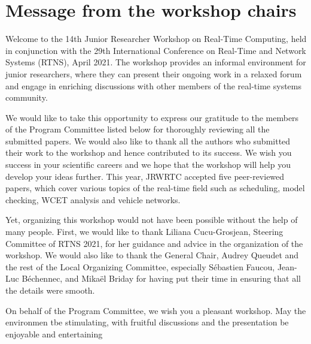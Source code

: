 \documentclass[10pt]{article}
\begin{document}



\newpage



\section*{Message from the workshop chairs}


Welcome to the 14th Junior Researcher Workshop on Real-Time Computing, held in 
conjunction with the 29th International Conference on Real-Time and Network 
Systems (RTNS), April 2021. The workshop provides an informal 
environment for junior researchers, where they can present their ongoing work 
in a relaxed forum and engage in enriching discussions with other members of 
the real-time systems community.

We would like to take this opportunity to express our gratitude to the members 
of the Program Committee listed below for thoroughly reviewing all the 
submitted papers.  We would also like to thank all the authors who submitted 
their work to the workshop and hence contributed to its success.  We wish you 
success in your scientific careers and we hope that the workshop will help you 
develop your ideas further. This year, JRWRTC accepted five peer-reviewed 
papers,  which cover various topics of the real-time field such as scheduling, 
model checking, WCET analysis and vehicle networks. 


Yet, organizing this workshop would not have been possible 
without the help of many people. First,  we would like to thank Liliana 
Cucu-Grosjean, Steering Committee of RTNS 2021, for her guidance and advice in 
the organization of the workshop. We would also 
like to thank the General Chair, Audrey Queudet and the rest of the Local 
Organizing Committee, especially Sébastien Faucou, Jean-Luc Béchennec, and 
Mikaël Briday for having put their time in ensuring that all the details were 
smooth.


On behalf of the 
Program Committee, we wish you a pleasant workshop. May the environmen tbe 
stimulating, with fruitful discussions and the presentation be enjoyable and 
entertaining
\end{document}

